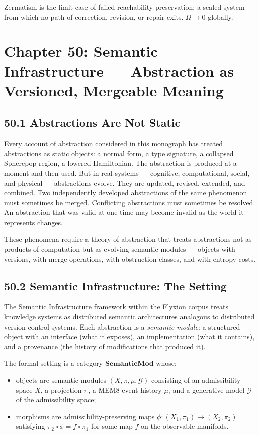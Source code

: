 \documentclass[12pt,letterpaper]{article}
\theoremstyle{remark}
\begin{document}
Zermatism is the limit case of failed reachability preservation:
a sealed system from which no path of correction, revision, or
repair exits. $\Omega \to 0$ globally.

\newpage
\section{Chapter 50: Semantic Infrastructure —
Abstraction as Versioned, Mergeable Meaning}

\subsection{50.1 Abstractions Are Not Static}

Every account of abstraction considered in this monograph has
treated abstractions as static objects: a normal form, a type
signature, a collapsed Spherepop region, a lowered Hamiltonian. The
abstraction is produced at a moment and then used. But in real
systems — cognitive, computational, social, and physical — abstractions
evolve. They are updated, revised, extended, and combined. Two
independently developed abstractions of the same phenomenon must
sometimes be merged. Conflicting abstractions must sometimes be
resolved. An abstraction that was valid at one time may become
invalid as the world it represents changes.

These phenomena require a theory of abstraction that treats
abstractions not as products of computation but as evolving semantic
modules — objects with versions, with merge operations, with
obstruction classes, and with entropy costs.

\subsection{50.2 Semantic Infrastructure: The Setting}

The Semantic Infrastructure framework within the Flyxion corpus
treats knowledge systems as distributed semantic architectures
analogous to distributed version control systems. Each abstraction
is a \emph{semantic module}: a structured object with an interface
(what it exposes), an implementation (what it contains), and a
provenance (the history of modifications that produced it).

The formal setting is a category $\mathbf{SemanticMod}$ whose:
\begin{itemize}
\item objects are semantic modules $(X, \pi, \mu, \mathcal{G})$
  consisting of an admissibility space $X$, a projection $\pi$, a
  MEM\textbar{}8 event history $\mu$, and a generative model
  $\mathcal{G}$ of the admissibility space;
\item morphisms are admissibility-preserving maps $\phi:
  (X_1, \pi_1) \to (X_2, \pi_2)$ satisfying $\pi_2 \circ \phi =
  f \circ \pi_1$ for some map $f$ on the observable manifolds.
\end{itemize}
\end{document}
